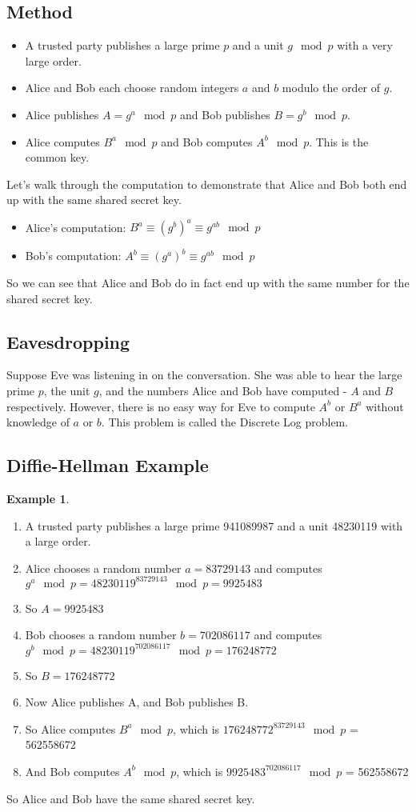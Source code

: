 \documentclass[10pt]{article}
\theoremstyle{definition}
\newtheorem{ex}[theorem]{Example}
\theoremstyle{remark}
\begin{document}
\subsection{Method}
\begin{itemize}
\item A trusted party publishes a large prime $p$ and a unit $g \mod p$ with a very large order.
\item Alice and Bob each choose random integers $a$ and $b$ modulo the order of $g$.
\item Alice publishes $A = g^a \mod p$ and Bob publishes $B = g^b \mod p$.
\item Alice computes $B^a \mod p$ and Bob computes $A^b \mod p$.  This is the common key.
\end{itemize}
Let's walk through the computation to demonstrate that Alice and Bob both end up with the same shared secret key.
\begin{itemize}
\item Alice's computation: $B^a \equiv (g^b)^a \equiv g^{ab} \mod p$
\item Bob's computation: $A^b \equiv (g^a)^b \equiv g^{ab} \mod p$
\end{itemize}
So we can see that Alice and Bob do in fact end up with the same number for the shared secret key.
\subsection{Eavesdropping}
Suppose Eve was listening in on the conversation.  She was able to hear the large prime $p$, the unit $g$, and the numbers Alice and Bob have computed - $A$ and $B$ respectively.  However, there is no easy way for Eve to compute $A^b$ or $B^a$ without knowledge of $a$ or $b$.  This problem is called the Discrete Log problem.
\subsection{Diffie-Hellman Example}
\begin{ex}
\begin{enumerate}
\item A trusted party publishes a large prime 941089987 and a unit 48230119 with a large order.
\item Alice chooses a random number $a=83729143$ and computes $g^a \mod p = 48230119^{83729143} \mod p = 9925483$
\item So $A=9925483$
\item Bob chooses a random number $b=702086117$ and computes $g^b \mod p = 48230119^{702086117} \mod p = 176248772$
\item So $B=176248772$
\item Now Alice publishes A, and Bob publishes B.
\item So Alice computes $B^a \mod p$, which is $176248772^83729143 \mod p$ = 562558672
\item And Bob computes $A^b \mod p$, which is $9925483^702086117 \mod p$ = 562558672
\end{enumerate}
So Alice and Bob have the same shared secret key.
\end{ex}
\end{document}
